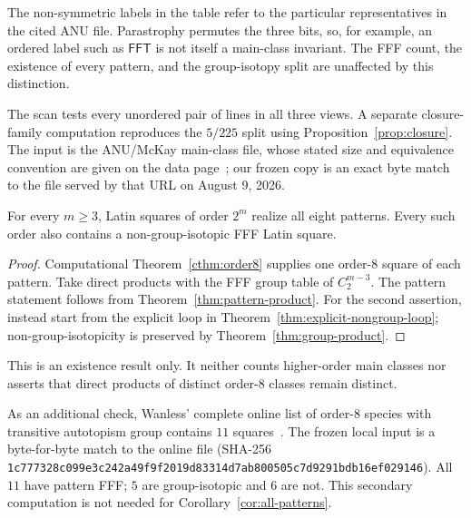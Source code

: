 The non-symmetric labels in the table refer to the particular representatives
in the cited ANU file.  Parastrophy permutes the three bits, so, for example,
an ordered label such as $\mathsf{FFT}$ is not itself a main-class invariant.
The FFF count, the existence of every pattern, and the group-isotopy split are
unaffected by this distinction.

The scan tests every unordered pair of lines in all three views.  A separate
closure-family computation reproduces the $5/225$ split using
Proposition~\ref{prop:closure}.  The input is the ANU/McKay main-class file,
whose stated size and equivalence convention are given on the data
page~\cite{McKayLatinData}; our frozen copy is an exact byte match to the file
served by that URL on August 9, 2026.

\begin{corollary}\label{cor:all-patterns}
For every $m\geq3$, Latin squares of order $2^m$ realize all eight patterns.
Every such order also contains a non-group-isotopic FFF Latin square.
\end{corollary}

\begin{proof}
Computational Theorem~\ref{cthm:order8} supplies one order-$8$ square of each
pattern.  Take direct products with the FFF group table of $C_2^{m-3}$.
The pattern statement follows from Theorem~\ref{thm:pattern-product}.  For
the second assertion, instead start from the explicit loop in
Theorem~\ref{thm:explicit-nongroup-loop}; non-group-isotopicity is preserved
by Theorem~\ref{thm:group-product}.
\end{proof}

This is an existence result only.  It neither counts higher-order main
classes nor asserts that direct products of distinct order-$8$ classes remain
distinct.

As an additional check, Wanless' complete online list of order-$8$ species
with transitive autotopism group contains $11$ squares~\cite{WanlessTransitiveData}.
The frozen local input is a byte-for-byte match to the online file (SHA-256
\nolinkurl{1c777328c099e3c242a49f9f2019d83314d7ab800505c7d9291bdb16ef029146}).
All $11$ have pattern FFF; $5$ are group-isotopic and $6$ are not.  This
secondary computation is not needed for Corollary~\ref{cor:all-patterns}.
